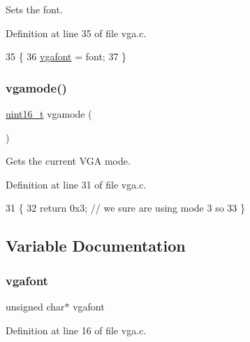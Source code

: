 Sets the font. 



Definition at line 35 of file vga.\+c.


\begin{DoxyCode}
35                                   \{
36     \hyperlink{a00041_a586c0ac088deb9338d9b1464dcd587c8_a586c0ac088deb9338d9b1464dcd587c8}{vgafont} = font;
37 \}
\end{DoxyCode}
\mbox{\label{a00041_af6d170c9401ea8f94d4c5cf09347cca7_af6d170c9401ea8f94d4c5cf09347cca7}} 
\subsubsection{\texorpdfstring{vgamode()}{vgamode()}}
{\footnotesize\ttfamily \hyperlink{a00116_a273cf69d639a59973b6019625df33e30_a273cf69d639a59973b6019625df33e30}{uint16\+\_\+t} vgamode (\begin{DoxyParamCaption}{ }\end{DoxyParamCaption})}



Gets the current V\+GA mode. 



Definition at line 31 of file vga.\+c.


\begin{DoxyCode}
31                    \{
32     \textcolor{keywordflow}{return} 0x3; \textcolor{comment}{// we sure are using mode 3 so}
33 \}
\end{DoxyCode}


\subsection{Variable Documentation}
\mbox{\label{a00041_a586c0ac088deb9338d9b1464dcd587c8_a586c0ac088deb9338d9b1464dcd587c8}} 
\subsubsection{\texorpdfstring{vgafont}{vgafont}}
{\footnotesize\ttfamily unsigned char$\ast$ vgafont}



Definition at line 16 of file vga.\+c.

